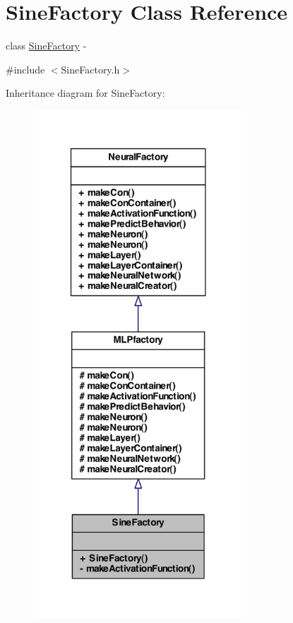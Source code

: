 \hypertarget{class_sine_factory}{
\section{SineFactory Class Reference}
\label{class_sine_factory}
}


class \hyperlink{class_sine_factory}{SineFactory} -\/  




{\ttfamily \#include $<$SineFactory.h$>$}



Inheritance diagram for SineFactory:\nopagebreak
\begin{figure}[H]
\begin{center}
\leavevmode
\includegraphics[width=222pt]{class_sine_factory__inherit__graph}
\end{center}
\end{figure}


